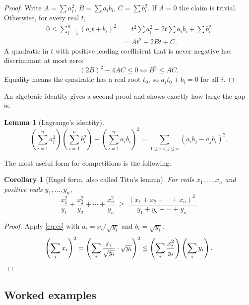 \documentclass[11pt,a4paper]{article}
\newtheorem{lemma}[theorem]{Lemma}
\newtheorem{corollary}[theorem]{Corollary}
\theoremstyle{definition}
\theoremstyle{remark}
\begin{document}
\begin{proof}
Write $A = \sum a_i^2$, $B = \sum a_i b_i$, $C = \sum b_i^2$. If $A = 0$ the claim is trivial. Otherwise, for every real $t$,
\begin{align*}
  0 \leq \sum_{i=1}^{n} (a_i t + b_i)^2
    &= t^2 \sum a_i^2 + 2t \sum a_i b_i + \sum b_i^2 \\
    &= A t^2 + 2B t + C.
\end{align*}
A quadratic in $t$ with positive leading coefficient that is never negative has discriminant at most zero:
\[
  (2B)^2 - 4AC \leq 0 \iff B^2 \leq AC.
\]
Equality means the quadratic has a real root $t_0$, so $a_i t_0 + b_i = 0$ for all $i$.
\end{proof}

An algebraic identity gives a second proof and shows exactly how large the gap is.

\begin{lemma}[Lagrange's identity]\label{lem:lagrange}
\begin{equation}\label{eq:lagrange}
  \left(\sum_{i=1}^{n} a_i^2\right)\left(\sum_{i=1}^{n} b_i^2\right) - \left(\sum_{i=1}^{n} a_i b_i\right)^{2}
  = \sum_{1 \leq i < j \leq n} (a_i b_j - a_j b_i)^2.
\end{equation}
\end{lemma}

The most useful form for competitions is the following.

\begin{corollary}[Engel form, also called Titu's lemma]\label{cor:engel}
For reals $x_1, \dots, x_n$ and positive reals $y_1, \dots, y_n$,
\begin{equation}\label{eq:engel}
  \frac{x_1^2}{y_1} + \frac{x_2^2}{y_2} + \cdots + \frac{x_n^2}{y_n} \;\geq\; \frac{(x_1 + x_2 + \cdots + x_n)^2}{y_1 + y_2 + \cdots + y_n}.
\end{equation}
\end{corollary}

\begin{proof}
Apply \eqref{eq:cs} with $a_i = x_i/\sqrt{y_i}$ and $b_i = \sqrt{y_i}$:
\[
  \left(\sum_i x_i\right)^2 = \left(\sum_i \frac{x_i}{\sqrt{y_i}}\cdot\sqrt{y_i}\right)^2
  \leq \left(\sum_i \frac{x_i^2}{y_i}\right)\left(\sum_i y_i\right). \qedhere
\]
\end{proof}

\subsection{Worked examples}
\end{document}
